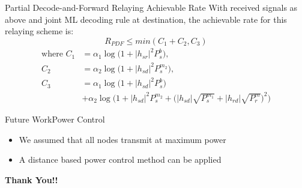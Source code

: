 \documentclass{beamer}
\begin{document}
\begin{frame}{Partial Decode-and-Forward Relaying} {Achievable Rate}
\vspace{-1cm}
With received signals as above and joint ML decoding rule at destination, the achievable rate for this relaying scheme is:
\begin{equation*} \label{eq:rate}
R_{PDF} \leq min(C_1+C_2,C_3)
\end{equation*}
\begin{align*}
\text{where } C_1 &= \alpha_1 \log\Big(1+|h_{sr}|^2P_s^b\Big),\\
C_2 &= \alpha_2 \log\Big(1+|h_{sd}|^2P_s^{m_2}\Big),\\
C_3 &= \alpha_1 \log\Big(1+|h_{sd}|^2P_s^b\Big) \\ &+ \alpha_2\log\bigg(1+|h_{sd}|^2P_s^{m_2} + \Big(|h_{sd}|\sqrt{P_s^{m_1}} + |h_{rd}|\sqrt{P_r^m}\Big)^2\bigg)
\end{align*}
\end{frame}

\begin{frame}{Future Work}{Power Control}
\vspace{1cm}
\begin{itemize}  
  \item
   We assumed that all nodes transmit at maximum power
   \vspace{1cm}
   \pause
  \item A distance based power control method can be applied 
  \end{itemize}
\end{frame}


\begin{frame}{}
\centering
\textbf{Thank You!!}


\end{frame}
\end{document}
